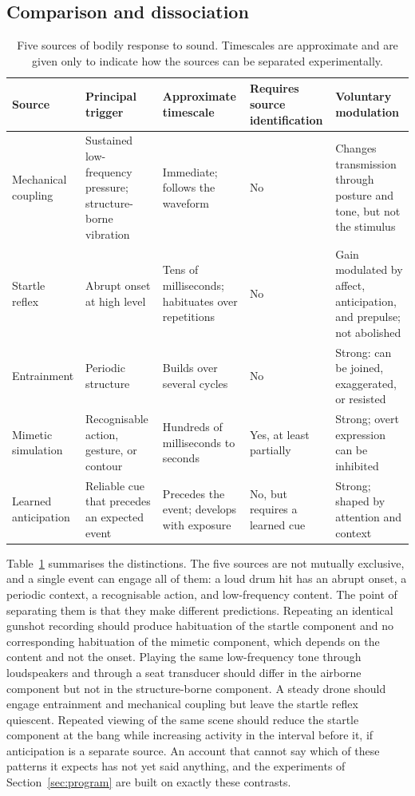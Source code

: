 \documentclass[11pt]{article}
\theoremstyle{plain}
\theoremstyle{definition}
\begin{document}
\subsection{Comparison and dissociation}

\begin{table}[t]
\centering
\small
\renewcommand{\arraystretch}{1.25}
\begin{tabular}{@{}>{\raggedright\arraybackslash}p{2.6cm}>{\raggedright\arraybackslash}p{3.2cm}>{\raggedright\arraybackslash}p{2.6cm}>{\raggedright\arraybackslash}p{2.4cm}>{\raggedright\arraybackslash}p{2.6cm}@{}}
\toprule
Source & Principal trigger & Approximate timescale & Requires source identification & Voluntary modulation \\
\midrule
Mechanical coupling & Sustained low-frequency pressure; structure-borne vibration & Immediate; follows the waveform & No & Changes transmission through posture and tone, but not the stimulus \\
Startle reflex & Abrupt onset at high level & Tens of milliseconds; habituates over repetitions & No & Gain modulated by affect, anticipation, and prepulse; not abolished \\
Entrainment & Periodic structure & Builds over several cycles & No & Strong: can be joined, exaggerated, or resisted \\
Mimetic simulation & Recognisable action, gesture, or contour & Hundreds of milliseconds to seconds & Yes, at least partially & Strong; overt expression can be inhibited \\
Learned anticipation & Reliable cue that precedes an expected event & Precedes the event; develops with exposure & No, but requires a learned cue & Strong; shaped by attention and context \\
\bottomrule
\end{tabular}
\caption{Five sources of bodily response to sound. Timescales are approximate and are given only to indicate how the sources can be separated experimentally.}
\label{tab:sources}
\end{table}

Table~\ref{tab:sources} summarises the distinctions. The five sources are not mutually exclusive, and a single event can engage all of them: a loud drum hit has an abrupt onset, a periodic context, a recognisable action, and low-frequency content. The point of separating them is that they make different predictions. Repeating an identical gunshot recording should produce habituation of the startle component and no corresponding habituation of the mimetic component, which depends on the content and not the onset. Playing the same low-frequency tone through loudspeakers and through a seat transducer should differ in the airborne component but not in the structure-borne component. A steady drone should engage entrainment and mechanical coupling but leave the startle reflex quiescent. Repeated viewing of the same scene should reduce the startle component at the bang while increasing activity in the interval before it, if anticipation is a separate source. An account that cannot say which of these patterns it expects has not yet said anything, and the experiments of Section~\ref{sec:program} are built on exactly these contrasts.
\end{document}
